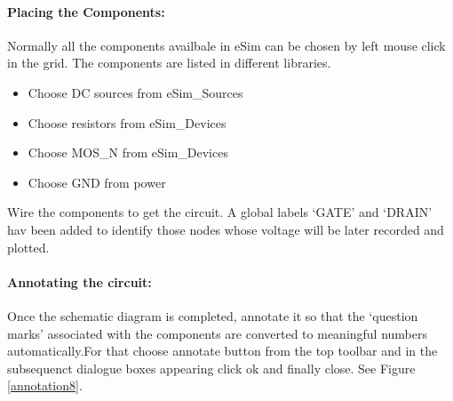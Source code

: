 \paragraph{Placing the Components:} Normally all the components availbale in eSim can be chosen by left mouse click in the grid. The components are listed in different libraries. %


\begin{itemize}
\item
Choose DC sources from eSim\_Sources
\item
Choose resistors from eSim\_Devices
\item
Choose MOS\_N from eSim\_Devices
\item
Choose GND from power
\end{itemize}



Wire the components to get the circuit. A global labels `GATE' and `DRAIN' hav been added to identify those nodes whose voltage will be later recorded and plotted.

\paragraph{Annotating the circuit:} Once the schematic diagram is completed, annotate it so that the `question marks' associated with the components are converted to meaningful numbers automatically.For that choose annotate button from the top toolbar%
and in the subsequenct dialogue boxes appearing click ok and finally close. See Figure \ref{annotation8}.




